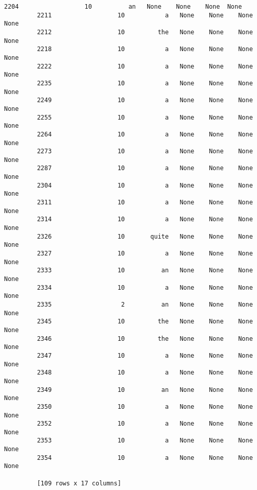 \documentclass[11pt]{article}
\begin{document}
\begin{Verbatim}[commandchars=\\\{\}]
         2204                  10          an   None    None    None  None  
         2211                  10           a   None    None    None  None  
         2212                  10         the   None    None    None  None  
         2218                  10           a   None    None    None  None  
         2222                  10           a   None    None    None  None  
         2235                  10           a   None    None    None  None  
         2249                  10           a   None    None    None  None  
         2255                  10           a   None    None    None  None  
         2264                  10           a   None    None    None  None  
         2273                  10           a   None    None    None  None  
         2287                  10           a   None    None    None  None  
         2304                  10           a   None    None    None  None  
         2311                  10           a   None    None    None  None  
         2314                  10           a   None    None    None  None  
         2326                  10       quite   None    None    None  None  
         2327                  10           a   None    None    None  None  
         2333                  10          an   None    None    None  None  
         2334                  10           a   None    None    None  None  
         2335                   2          an   None    None    None  None  
         2345                  10         the   None    None    None  None  
         2346                  10         the   None    None    None  None  
         2347                  10           a   None    None    None  None  
         2348                  10           a   None    None    None  None  
         2349                  10          an   None    None    None  None  
         2350                  10           a   None    None    None  None  
         2352                  10           a   None    None    None  None  
         2353                  10           a   None    None    None  None  
         2354                  10           a   None    None    None  None  
         
         [109 rows x 17 columns]
\end{Verbatim}
            
\end{document}
